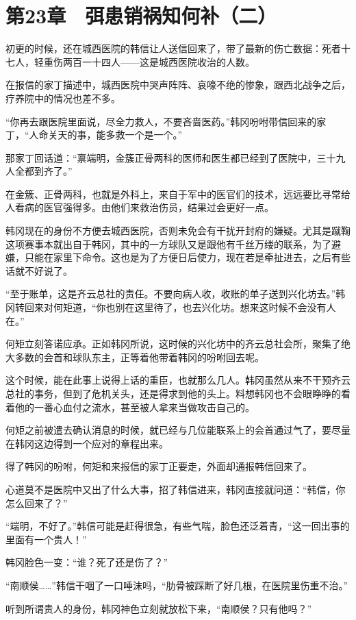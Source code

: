 \section{第23章　弭患销祸知何补（二）}

初更的时候，还在城西医院的韩信让人送信回来了，带了最新的伤亡数据：死者十七人，轻重伤两百一十四人——这是城西医院收治的人数。

在报信的家丁描述中，城西医院中哭声阵阵、哀嚎不绝的惨象，跟西北战争之后，疗养院中的情况也差不多。

“你再去跟医院里面说，尽全力救人，不要吝啬医药。”韩冈吩咐带信回来的家丁，“人命关天的事，能多救一个是一个。”

那家丁回话道：“禀端明，金簇正骨两科的医师和医生都已经到了医院中，三十九人全都到齐了。”

在金簇、正骨两科，也就是外科上，来自于军中的医官们的技术，远远要比寻常给人看病的医官强得多。由他们来救治伤员，结果过会更好一点。

韩冈现在的身份不方便去城西医院，否则未免会有干扰开封府的嫌疑。尤其是蹴鞠这项赛事本就出自于韩冈，其中的一方球队又是跟他有千丝万缕的联系，为了避嫌，只能在家里下命令。这也是为了方便日后使力，现在若是牵扯进去，之后有些话就不好说了。

“至于账单，这是齐云总社的责任。不要向病人收，收账的单子送到兴化坊去。”韩冈转回来对何矩道，“你也别在这里待了，也去兴化坊。想来这时候不会没有人在。”

何矩立刻答诺应承。正如韩冈所说，这时候的兴化坊中的齐云总社会所，聚集了绝大多数的会首和球队东主，正等着他带着韩冈的吩咐回去呢。

这个时候，能在此事上说得上话的重臣，也就那么几人。韩冈虽然从来不干预齐云总社的事务，但到了危机关头，还是得求到他的头上。料想韩冈也不会眼睁睁的看着他的一番心血付之流水，甚至被人拿来当做攻击自己的。

何矩之前被遣去确认消息的时候，就已经与几位能联系上的会首通过气了，要尽量在韩冈这边得到一个应对的章程出来。

得了韩冈的吩咐，何矩和来报信的家丁正要走，外面却通报韩信回来了。

心道莫不是医院中又出了什么大事，招了韩信进来，韩冈直接就问道：“韩信，你怎么回来了？”

“端明，不好了。”韩信可能是赶得很急，有些气喘，脸色还泛着青，“这一回出事的里面有一个贵人！”

韩冈脸色一变：“谁？死了还是伤了？”

“南顺侯……”韩信干咽了一口唾沫吗，“肋骨被踩断了好几根，在医院里伤重不治。”

听到所谓贵人的身份，韩冈神色立刻就放松下来，“南顺侯？只有他吗？”

